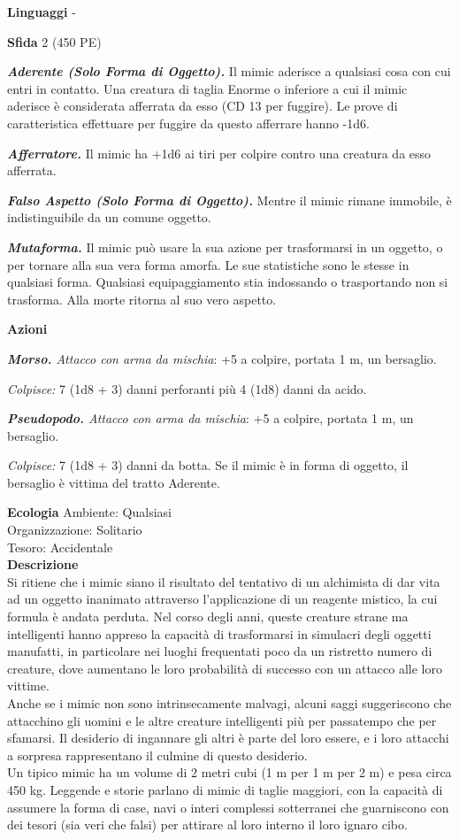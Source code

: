 \begin{multicols}{2}
\textbf{Linguaggi} -

\textbf{Sfida} 2 (450 PE)

\emph{\textbf{Aderente (Solo Forma di Oggetto).}} Il mimic aderisce a qualsiasi cosa con cui entri in contatto. Una creatura di taglia Enorme o inferiore a cui il mimic aderisce è considerata afferrata da esso (CD 13 per fuggire). Le prove di caratteristica effettuare per fuggire da
questo afferrare hanno -1d6.

\emph{\textbf{Afferratore.}} Il mimic ha +1d6 ai tiri per colpire contro una creatura da esso afferrata.

\emph{\textbf{Falso Aspetto (Solo Forma di Oggetto).}} Mentre il mimic rimane immobile, è indistinguibile da un comune oggetto.

\emph{\textbf{Mutaforma.}} Il mimic può usare la sua azione per trasformarsi in un oggetto, o per tornare alla sua vera forma amorfa. Le sue statistiche sono le stesse in qualsiasi forma. Qualsiasi equipaggiamento stia indossando o trasportando non si trasforma. Alla morte ritorna al suo vero aspetto.

\textbf{Azioni}

\emph{\textbf{Morso.} Attacco con arma da mischia}: +5 a colpire, portata 1 m, un bersaglio.

\emph{Colpisce:} 7 (1d8 + 3) danni perforanti più 4 (1d8) danni da acido.

\emph{\textbf{Pseudopodo.} Attacco con arma da mischia}: +5 a colpire, portata 1 m, un bersaglio.

\emph{Colpisce:} 7 (1d8 + 3) danni da botta. Se il mimic è in forma di oggetto, il bersaglio è vittima del tratto Aderente.

\textbf{Ecologia}
Ambiente: Qualsiasi\\
Organizzazione: Solitario\\
Tesoro: Accidentale\\
\textbf{Descrizione}\\
Si ritiene che i mimic siano il risultato del tentativo di un alchimista di dar vita ad un oggetto inanimato attraverso l'applicazione di un reagente mistico, la cui formula è andata perduta. Nel corso degli anni, queste creature strane ma intelligenti hanno appreso la capacità di trasformarsi in simulacri degli oggetti manufatti, in particolare nei luoghi frequentati poco da un ristretto numero di creature, dove aumentano le loro probabilità di successo con un attacco alle loro vittime.\\
Anche se i mimic non sono intrinsecamente malvagi, alcuni saggi suggeriscono che attacchino gli uomini e le altre creature intelligenti più per passatempo che per sfamarsi. Il desiderio di ingannare gli altri è parte del loro essere, e i loro attacchi a sorpresa rappresentano il culmine di questo desiderio.\\
Un tipico mimic ha un volume di 2 metri cubi (1 m per 1 m per 2 m) e pesa circa 450 kg. Leggende e storie parlano di mimic di taglie maggiori, con la capacità di assumere la forma di case, navi o interi complessi sotterranei che guarniscono con dei tesori (sia veri che falsi) per attirare al loro interno il loro ignaro cibo.\\



\end{multicols}

